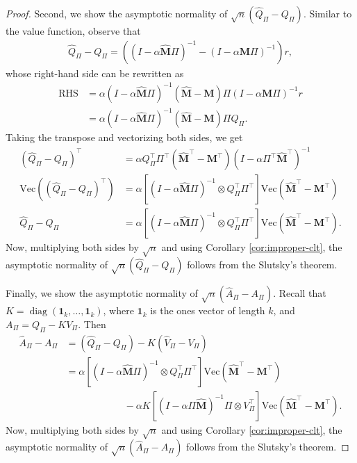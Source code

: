 \documentclass[twoside,11pt]{article}
\renewcommand{\Vec}[1]{\text{Vec}\lp #1\rp}
\numberwithin{equation}{section}
\newcommand{\lp}{\left(}
\newcommand{\rp}{\right)}
\newcommand{\lb}{\left[}
\newcommand{\rb}{\right]}
\begin{document}
\begin{proof}
Second, we show the asymptotic normality of $\sqrt{n} \lp  \hat Q_\Pi - Q_\Pi \rp$. 
Similar to the value function, observe that 
    \begin{align*}
        \hat Q_\Pi - Q_\Pi = \lp\lp I-\alpha\mathbf{\hat M}\Pi \rp^{-1} - \lp I-\alpha\mathbf{M}\Pi \rp^{-1}\rp r,
    \end{align*}
    whose right-hand side can be rewritten as
    \begin{align*}
         \text{RHS} &= \alpha \lp I-\alpha\mathbf{\hat M}\Pi \rp^{-1}  \lp \mathbf{\hat M} - \mathbf{M} \rp \Pi\lp I-\alpha \mathbf{M}\Pi\rp^{-1} r \\
         & = \alpha \lp I-\alpha \mathbf{\hat M}\Pi\rp^{-1}  \lp \mathbf{\hat M} - \mathbf{M} \rp \Pi Q_\Pi.
    \end{align*}
    Taking the transpose and vectorizing both sides, we get
    \begin{align*}
        \lp  \hat Q_\Pi - Q_\Pi \rp^\top & = \alpha Q_\Pi^\top \Pi^\top (\mathbf{\hat M}^\top - \mathbf{M}^\top) \lp I-\alpha\Pi^\top \mathbf{\hat M}^\top  \rp^{-1} \\ 
        \Vec{\lp \hat Q_\Pi - Q_\Pi \rp^\top} & = \alpha \left[\lp I-\alpha \mathbf{\hat M} \Pi \rp^{-1}  \otimes  Q_\Pi^\top \Pi^\top \right]\Vec{\mathbf{\hat M}^\top - \mathbf{M}^\top} \\
        \hat Q_\Pi - Q_\Pi & = \alpha \left[\lp I-\alpha \mathbf{\hat M} \Pi \rp^{-1}  \otimes  Q_\Pi^\top \Pi^\top \right]\Vec{\mathbf{\hat M}^\top - \mathbf{M}^\top} .
    \end{align*}
    Now, multiplying both sides by $\sqrt{n}$ and using Corollary \ref{cor:improper-clt}, the asymptotic normality of $\sqrt{n} \lp  \hat Q_\Pi - Q_\Pi \rp$ follows from the Slutsky's theorem. 

Finally, we show the asymptotic normality of $\sqrt{n} \lp  \hat A_\Pi - A_\Pi \rp$.
Recall that $K = \operatorname{diag}(\mathbf{1}_k, \ldots, \mathbf{1}_k)$, where $\mathbf{1}_k$ is the ones vector of length $k$, and $A_\Pi = Q_\Pi - KV_\Pi$.
Then
\begin{align*}
\hat A_\Pi - A_\Pi & = \lp \hat Q_\Pi - Q_\Pi\rp - K \lp \hat V_\Pi - V_\Pi\rp \\
& = \alpha \lb \lp I - \alpha \mathbf{\hat M} \Pi\rp^{-1} \otimes Q_\Pi^\top \Pi^\top \rb \Vec{\mathbf{\hat M}^\top- \mathbf{M}^\top} \\
& \hspace{1in} -\alpha K \lb \lp I - \alpha \Pi \mathbf{\hat M} \rp^{-1} \Pi \otimes V_\Pi^\top  \rb \Vec{\mathbf{\hat M}^\top - \mathbf{M}^\top}.
\end{align*}
Now, multiplying both sides by $\sqrt{n}$ and using Corollary \ref{cor:improper-clt}, the asymptotic normality of $\sqrt{n} \lp  \hat A_\Pi - A_\Pi \rp$ follows from the Slutsky's theorem. 
\end{proof}
\end{document}
